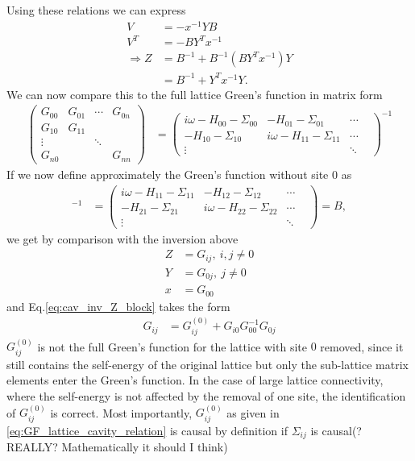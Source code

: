 \documentclass[12pt,a4paper]{scrartcl}
\numberwithin{equation}{section}
\begin{document}
Using these relations we can express
\begin{align}
V &= -x^{-1}YB \\
 V^{T} &= -BY^Tx^{-1} \\ 
 \Rightarrow Z &= B^{-1} + B^{-1} (BY^Tx^{-1}) Y \\
 &=  B^{-1} + Y^T x^{-1} Y \label{eq:cav_inv_Z_block}.
\end{align}
We can now compare this to the full lattice Green's function in matrix form
\begin{align}
\begin{pmatrix}
  G_{00} &  G_{01} & \cdots & G_{0n}  \\
  G_{10} &  G_{11} &        &         \\
  \vdots &         & \ddots &         \\
  G_{n0 }&         &        & G_{nn}        
\end{pmatrix}
&=
\begin{pmatrix}
 i\omega -H_{00}-\Sigma_{00} & -H_{01} -\Sigma_{01} & \cdots \\
 -H_{10} -\Sigma_{10} & i\omega -H_{11}-\Sigma_{11} & \cdots \\
 \vdots &   & \ddots &
\end{pmatrix}^{-1}
\end{align}
If we now define approximately the Green's function 
without site $0$ as
\begin{align}
[G^{(0)}_{ij}]^{-1} 
&=
\begin{pmatrix}
 i\omega -H_{11}-\Sigma_{11} & -H_{12} -\Sigma_{12} & \cdots \\
 -H_{21} -\Sigma_{21} & i\omega -H_{22}-\Sigma_{22} & \cdots \\
 \vdots &   & \ddots &
\end{pmatrix}
= B,
\end{align}
we get by comparison with the inversion above
\begin{align}
 Z &= G_{ij}, \ i,j\neq 0 \\
 Y &= G_{0j}, \ j\neq 0 \\
 x &= G_{00} 
\end{align}
and Eq.\eqref{eq:cav_inv_Z_block} takes the form
\begin{align}
 G_{ij} &= G^{(0)}_{ij} +  G_{i0} G^{-1}_{00} G_{0j} 
 \label{eq:GF_lattice_cavity_relation}
\end{align}
$G^{(0)}_{ij}$ is not the full Green's function for the lattice
with site $0$ removed, since it still contains 
the self-energy of the original lattice but only the 
sub-lattice matrix elements enter the Green's function.
In the case of large lattice connectivity,
where the self-energy is not affected by the removal of
one site, the identification of $G^{(0)}_{ij}$ is correct.
Most importantly, $G^{(0)}_{ij}$ as given in
\eqref{eq:GF_lattice_cavity_relation} is causal by definition
if $\Sigma_{ij}$ is causal(? REALLY? Mathematically it should I think)
\end{document}
